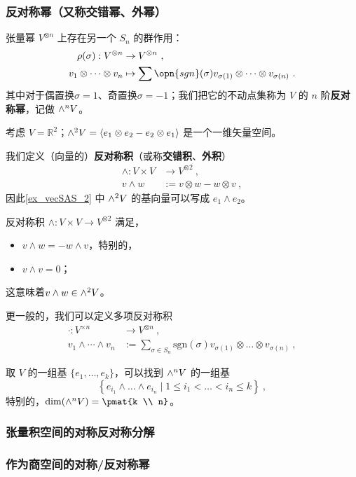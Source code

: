 \subsubsection{反对称幂（又称交错幂、外幂）}

张量幂 $V^{\otimes n}$ 上存在另一个 $S_n$ 的群作用：
\begin{equation}
\begin{aligned}
\rho(\sigma): V^{\otimes n} &\to V^{\otimes n}~, \\
v_1 \otimes \dots \otimes v_n &\mapsto \sum \opn{sgn}(\sigma) v_{\sigma(1)} \otimes \dots \otimes v_{\sigma(n)}~.
\end{aligned}
\end{equation}
其中对于偶置换$\sigma = 1$、奇置换$\sigma = -1$；我们把它的不动点集称为 $V$ 的 $n$ 阶\textbf{反对称幂}，记做 ${\large \wedge}^n V$。

\begin{example}{}\label{ex_vecSAS_2}
考虑 $V = \mathbb{R}^2$；${\large \wedge}^2 V = \langle e_1 \otimes e_2 - e_2 \otimes e_1 \rangle$ 是一个一维矢量空间。
\end{example}

我们定义（向量的）\textbf{反对称积}（或称\textbf{交错积}、\textbf{外积}）
\begin{equation}
\begin{aligned}
\wedge: V \times V &\to V^{\otimes 2}~, \\
v \wedge w &:= v \otimes w - w \otimes v~,
\end{aligned}
\end{equation}
因此\autoref{ex_vecSAS_2} 中 ${\large \wedge}^2 V$ 的基向量可以写成 $e_1 \wedge e_2$。

反对称积 $\wedge: V \times V \to V^{\otimes 2}$ 满足，
\begin{itemize}
\item $v \wedge w = - w \wedge v$，特别的，
\item $v \wedge v = 0$；
\end{itemize}
这意味着$v \wedge w \in {\large \wedge}^2 V$。

更一般的，我们可以定义多项反对称积
\begin{equation}
\begin{aligned}
\cdot: V^{\times n} &\to V^{\otimes n}~, \\
v_1 \wedge \cdots \wedge v_n &:= \sum_{\sigma \in S_n} \text{sgn}(\sigma) v_{\sigma(1)} \otimes \dots \otimes v_{\sigma(n)}~,
\end{aligned}
\end{equation}



取 $V$ 的一组基 $\{e_1, \dots, e_k\}$，可以找到 ${\large \wedge}^n V$ 的一组基
\begin{equation}
\left\{ e_{i_1} \wedge \dots \wedge e_{i_n} \mid 1 \leq i_1 < \dots < i_n \leq k \right\}~,
\end{equation}
特别的，$\dim({\large \wedge}^n V) = \pmat{k \\ n}$。

\subsubsection{张量积空间的对称反对称分解}

\subsubsection{作为商空间的对称/反对称幂}